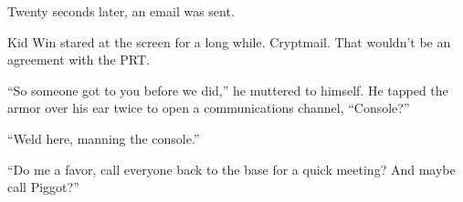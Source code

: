 Twenty seconds later, an email was sent.





Kid Win stared at the screen for a long while.  Cryptmail.  That wouldn't be an agreement with the PRT.



``So someone got to you before we did,'' he muttered to himself.  He tapped the armor over his ear twice to open a communications channel, ``Console?''



``Weld here, manning the console.''



``Do me a favor, call everyone back to the base for a quick meeting?  And maybe call Piggot?''





